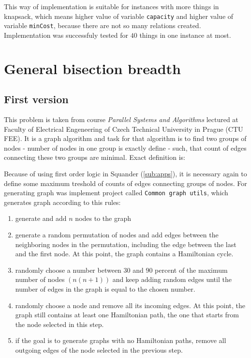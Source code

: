 \documentclass[11pt,twoside,a4paper]{book}
\begin{document}
This way of implementation is suitable for instances with more things in
knapsack, which means higher value of variable \verb|capacity| and higher value
of variable \verb|minCost|, because there are not so many relations created.
Implementation was successfuly tested for $40$ things in one instance at most.

\section{General bisection breadth}

\subsection{First version}

\label{sec:gbb}
This problem is taken from course \textit{Parallel Systems and Algorithms}
lectured at Faculty of Electrical Engeneering of Czech Technical University in
Prague (CTU FEE). It is a graph algorithm and task for that algorithm is to find
two groups of nodes - number of nodes in one group is exactly define - such, that
count of edges connecting these two groups are minimal. Exact definition is:

\begin{center}
\end{center}

Because of using first order logic in Squander (\ref{sub:apps}), it is necessary
again to define some maximum treshold of counts of edges connecting groups of nodes. For generating
graph was implement project called \verb|Common graph utils|, which generates
graph according to this rules:

\begin{enumerate}
  \item generate and add $n$ nodes to the graph
  \item generate a random permutation of nodes and add edges between the neighboring
nodes in the permutation, including the edge between the last and the first
node. At this point, the graph contains a Hamiltonian cycle.
  \item randomly choose a number between $30$ and $90$ percent of the maximum
  number of nodes $(n(n + 1))$ and keep adding random edges until the number of
  edges in the graph is equal to the chosen number.
  \item randomly choose a node and remove all its incoming edges. At this point, the
graph still contains at least one Hamiltonian path, the one that starts from the
node selected in this step.
\item if the goal is to generate graphs with no Hamiltonian paths, remove all outgoing
edges of the node selected in the previous step.
\end{enumerate}
\end{document}

